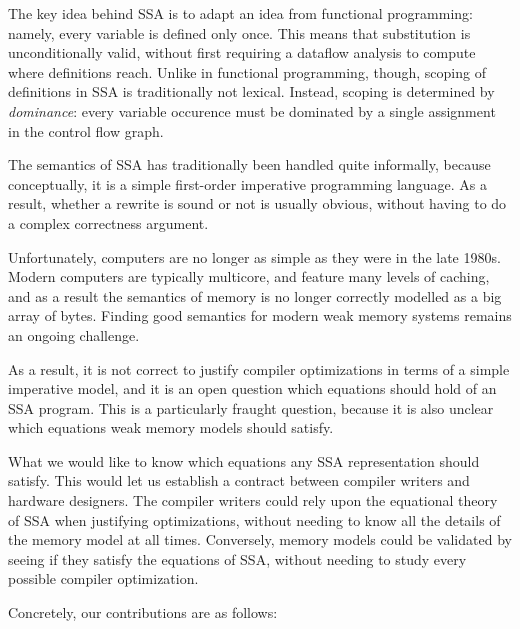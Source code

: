 \documentclass[acmsmall,screen,review]{acmart}
\begin{document}
The key idea behind SSA is to adapt an idea from functional
programming: namely, every variable is defined only once. This means
that substitution is unconditionally valid, without first requiring a
dataflow analysis to compute where definitions reach. Unlike in
functional programming, though, scoping of definitions in SSA is
traditionally not lexical. Instead, scoping is determined by
\emph{dominance}: every variable occurence must be dominated by a
single assignment in the control flow graph.

The semantics of SSA has traditionally been handled quite informally,
because conceptually, it is a simple first-order imperative
programming language. As a result, whether a rewrite is sound or
not is usually obvious, without having to do a complex correctness
argument.

Unfortunately, computers are no longer as simple as they were in the
late 1980s. Modern computers are typically multicore, and feature many
levels of caching, and as a result the semantics of memory is no
longer correctly modelled as a big array of bytes. Finding good
semantics for modern weak memory systems remains an ongoing challenge.

As a result, it is not correct to justify compiler optimizations in
terms of a simple imperative model, and it is an open question which
equations should hold of an SSA program. This is a particularly
fraught question, because it is also unclear which equations weak
memory models should satisfy.

What we would like to know which equations any SSA representation
should satisfy. This would let us establish a contract between
compiler writers and hardware designers. The compiler writers could
rely upon the equational theory of SSA when justifying optimizations,
without needing to know all the details of the memory model at all
times.  Conversely, memory models could be validated by seeing if they
satisfy the equations of SSA, without needing to study every possible
compiler optimization.

Concretely, our contributions are as follows: 
\end{document}
